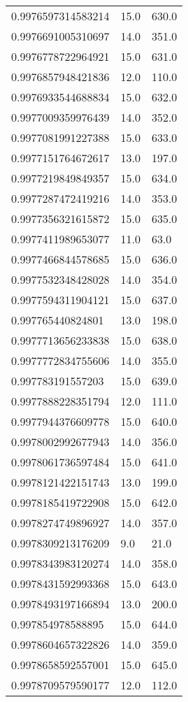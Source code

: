 \begin{center}
\begin{supertabular}[H]{p{0.30\textwidth}p{0.05\textwidth}p{0.05\textwidth}}
0.9976597314583214 & 15.0 & 630.0 \\ 
0.9976691005310697 & 14.0 & 351.0 \\ 
0.9976778722964921 & 15.0 & 631.0 \\ 
0.9976857948421836 & 12.0 & 110.0 \\ 
0.9976933544688834 & 15.0 & 632.0 \\ 
0.9977009359976439 & 14.0 & 352.0 \\ 
0.9977081991227388 & 15.0 & 633.0 \\ 
0.9977151764672617 & 13.0 & 197.0 \\ 
0.9977219849849357 & 15.0 & 634.0 \\ 
0.9977287472419216 & 14.0 & 353.0 \\ 
0.9977356321615872 & 15.0 & 635.0 \\ 
0.9977411989653077 & 11.0 & 63.0 \\ 
0.9977466844578685 & 15.0 & 636.0 \\ 
0.9977532348428028 & 14.0 & 354.0 \\ 
0.9977594311904121 & 15.0 & 637.0 \\ 
0.997765440824801 & 13.0 & 198.0 \\ 
0.9977713656233838 & 15.0 & 638.0 \\ 
0.9977772834755606 & 14.0 & 355.0 \\ 
0.997783191557203 & 15.0 & 639.0 \\ 
0.9977888228351794 & 12.0 & 111.0 \\ 
0.9977944376609778 & 15.0 & 640.0 \\ 
0.9978002992677943 & 14.0 & 356.0 \\ 
0.9978061736597484 & 15.0 & 641.0 \\ 
0.9978121422151743 & 13.0 & 199.0 \\ 
0.9978185419722908 & 15.0 & 642.0 \\ 
0.9978274749896927 & 14.0 & 357.0 \\ 
0.9978309213176209 & 9.0 & 21.0 \\ 
0.9978343983120274 & 14.0 & 358.0 \\ 
0.9978431592993368 & 15.0 & 643.0 \\ 
0.9978493197166894 & 13.0 & 200.0 \\ 
0.997854978588895 & 15.0 & 644.0 \\ 
0.9978604657322826 & 14.0 & 359.0 \\ 
0.9978658592557001 & 15.0 & 645.0 \\ 
0.9978709579590177 & 12.0 & 112.0 \\ 

\end{supertabular}
\end{center}
